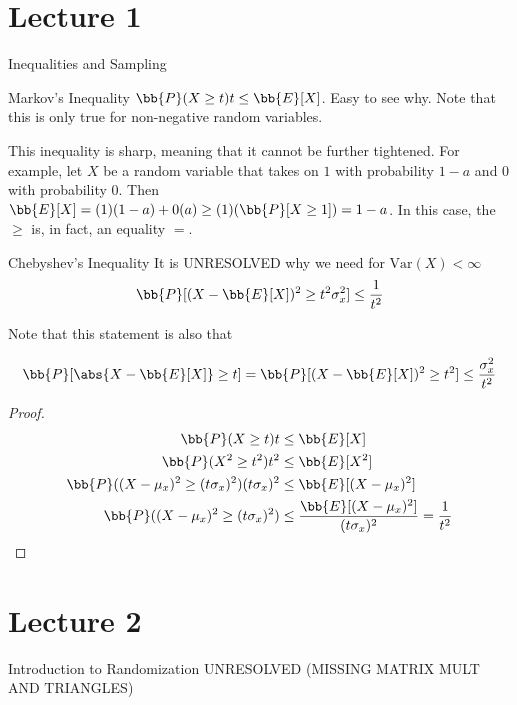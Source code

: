 \documentclass[../main.tex]{subfiles}
\begin{document}
\section{Lecture 1}{Inequalities and Sampling}

\begin{theorem}{Markov's Inequality}
    $\bb{P}(X \geq t) t \leq \bb{E}[X]$. Easy to see why. Note that this is only true
    for non-negative random variables.
    \label{thm:markov}
\end{theorem}

\begin{remark}
    This inequality is sharp, meaning that it cannot be further tightened. For example, let $X$ be a random variable that
    takes on $1$ with probability $1 - a$ and $0$ with probability $0$. Then $\bb{E}[X] = (1)(1 - a) + 0(a) \geq (1)(\bb{P}[X \geq 1]) = 1-a$. In this case, the $\geq$ is, in fact, an equality $=$.
\end{remark}

\begin{theorem}{Chebyshev's Inequality}
    It is UNRESOLVED why we need for $\text{Var}(X) < \infty$
    \[
        \bb{P}[(X - \bb{E}[X])^2 \geq t^2 \sigma_{x}^2] \leq \frac{1}{t^2}
    \]

    Note that this statement is also that

    \[
        \bb{P}[\abs{X - \bb{E}[X]} \geq t] = \bb{P}[(X - \bb{E}[X])^2 \geq t^2 ] \leq \frac{\sigma_x^2}{t^2}
    \]
\end{theorem}



\begin{proof}
    \begin{align*}
        \bb{P}(X \geq t) t &\leq \bb{E}[X]    \\
        \bb{P}(X^2 \geq t^2) t^2 &\leq \bb{E}[X^2]    \\
        \bb{P}((X - \mu_x)^2 \geq (t\sigma_x)^2) (t\sigma_x)^2 &\leq \bb{E}[(X - \mu_x)^2]    \\
        \bb{P}((X - \mu_x)^2 \geq (t\sigma_x)^2)  &\leq \frac{\bb{E}[(X - \mu_x)^2]}{(t\sigma_x)^2} = \frac{1}{t^2}    \\
    \end{align*}
\end{proof}

\section{Lecture 2}{Introduction to Randomization}
UNRESOLVED (MISSING MATRIX MULT AND TRIANGLES)
\end{document}
